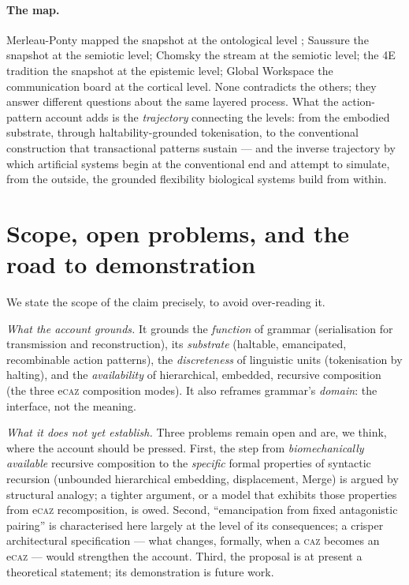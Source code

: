 \documentclass{article}
\newcommand{\caz}{\textsc{caz}}
\newcommand{\ecaz}{e\textsc{caz}}
\begin{document}
\paragraph{The map.} Merleau-Ponty mapped the snapshot at the ontological level \citep{Merleau-Ponty2013-vs}; Saussure the snapshot at the semiotic level; Chomsky the stream at the semiotic level; the 4E tradition the snapshot at the epistemic level; Global Workspace the communication board at the cortical level. None contradicts the others; they answer different questions about the same layered process. What the action-pattern account adds is the \emph{trajectory} connecting the levels: from the embodied substrate, through haltability-grounded tokenisation, to the conventional construction that transactional patterns sustain --- and the inverse trajectory by which artificial systems begin at the conventional end and attempt to simulate, from the outside, the grounded flexibility biological systems build from within.

\section{Scope, open problems, and the road to demonstration}\label{sec:scope}

We state the scope of the claim precisely, to avoid over-reading it.

\emph{What the account grounds.} It grounds the \emph{function} of grammar (serialisation for transmission and reconstruction), its \emph{substrate} (haltable, emancipated, recombinable action patterns), the \emph{discreteness} of linguistic units (tokenisation by halting), and the \emph{availability} of hierarchical, embedded, recursive composition (the three \ecaz{} composition modes). It also reframes grammar's \emph{domain}: the interface, not the meaning.

\emph{What it does not yet establish.} Three problems remain open and are, we think, where the account should be pressed. First, the step from \emph{biomechanically available} recursive composition to the \emph{specific} formal properties of syntactic recursion (unbounded hierarchical embedding, displacement, Merge) is argued by structural analogy; a tighter argument, or a model that exhibits those properties from \ecaz{} recomposition, is owed. Second, ``emancipation from fixed antagonistic pairing'' is characterised here largely at the level of its consequences; a crisper architectural specification --- what changes, formally, when a \caz{} becomes an \ecaz{} --- would strengthen the account. Third, the proposal is at present a theoretical statement; its demonstration is future work.
\end{document}
